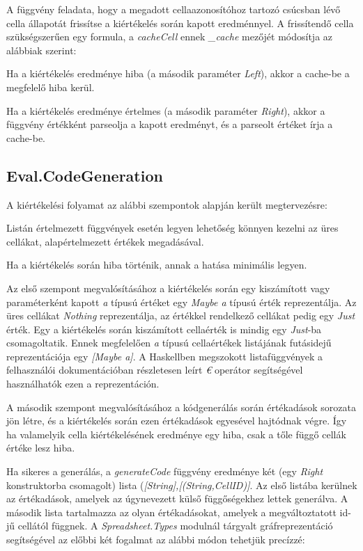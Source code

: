 A függvény feladata, hogy a megadott cellaazonosítóhoz tartozó csúcsban lévő cella állapotát frissítse a kiértékelés során kapott eredménnyel. A frissítendő cella szükségszerűen egy formula, a \textit{cacheCell} ennek \textit{\_cache} mezőjét módosítja az alábbiak szerint:

\begin{compactenum}
	\item Ha a kiértékelés eredménye hiba (a második paraméter \textit{Left}), akkor a cache-be a megfelelő hiba kerül.
	\item Ha a kiértékelés eredménye értelmes (a második paraméter \textit{Right}), akkor a függvény értékként parseolja a kapott eredményt, és a parseolt értéket írja a cache-be.
\end{compactenum}

\subsection{Eval.CodeGeneration}

A kiértékelési folyamat az alábbi szempontok alapján került megtervezésre:
\begin{compactenum}
	\item Listán értelmezett függvények esetén legyen lehetőség könnyen kezelni az üres cellákat, alapértelmezett értékek megadásával.
	\item Ha a kiértékelés során hiba történik, annak a hatása minimális legyen.
\end{compactenum}

Az első szempont megvalósításához a kiértékelés során egy kiszámított vagy paraméterként kapott \textit{a} típusú értéket egy \textit{Maybe a} típusú érték reprezentálja. Az üres cellákat \textit{Nothing} reprezentálja, az értékkel rendelkező cellákat pedig egy \textit{Just} érték. Egy a kiértékelés során kiszámított cellaérték is mindig egy \textit{Just}-ba csomagoltatik. Ennek megfelelően \textit{a} típusú cellaértékek listájának futásidejű reprezentációja egy \textit{[Maybe a]}. A Haskellben megszokott listafüggvények a felhasználói dokumentációban részletesen leírt \textit{€} operátor segítségével használhatók ezen a reprezentáción.

A második szempont megvalósításához a kódgenerálás során értékadások sorozata jön létre, és a kiértékelés során ezen értékadások egyesével hajtódnak végre. Így ha valamelyik cella kiértékelésének eredménye egy hiba, csak a tőle függő cellák értéke lesz hiba. 

Ha sikeres a generálás, a \textit{generateCode} függvény eredménye két (egy \textit{Right} konstruktorba csomagolt) lista (\textit{[String],[(String,CellID)]}. Az első listába kerülnek az értékadások, amelyek az úgynevezett külső függőségekhez lettek generálva. A második lista tartalmazza az olyan értékadásokat, amelyek a megváltoztatott id-jű cellától függnek. A \textit{Spreadsheet.Types} modulnál tárgyalt gráfreprezentáció segítségével az előbbi két fogalmat az alábbi módon tehetjük precízzé: 


